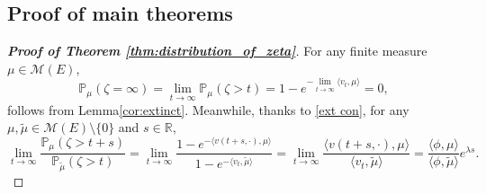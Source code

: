 \documentclass[12pt,a4paper]{amsart}
\numberwithin{equation}{section}
\theoremstyle{plain}
\theoremstyle{definition}
\begin{document}
\subsection{Proof of main theorems}
\begin{proof}[{\bf Proof of Theorem \ref{thm:distribution_of_zeta}}]
	For any finite measure $\mu\in \mathcal M(E)$,
  \[
    \mathbb P_\mu(\zeta=\infty)=\lim_{t\rightarrow\infty}\mathbb P_\mu(\zeta>t)=1-e^{-\lim_{t\rightarrow\infty}\langle v_t,\mu\rangle }=0,
  \]
	follows from Lemma\ref{cor:extinct}.
	Meanwhile, thanks to \eqref{ext con}, for any $\mu,\widetilde\mu\in \mathcal M(E)\setminus\{0\}$ and $s\in\mathbb R$,
  \[
    \lim_{t\rightarrow\infty}\frac{\mathbb P_{\mu}(\zeta>t+s)}{\mathbb P_{\widetilde\mu}(\zeta>t)}=\lim_{t\rightarrow\infty}\frac{1-e^{-\langle v(t+s,\cdot),\mu\rangle }}{1-e^{-\langle v_t,\widetilde\mu\rangle }}
    =\lim_{t\rightarrow\infty}\frac{\langle v(t+s,\cdot),\mu\rangle }{\langle v_t,\widetilde\mu\rangle }=\frac{\langle \phi,\mu\rangle }{\langle \phi,\widetilde\mu\rangle }e^{\lambda s}.
  \]
\end{proof}
\end{document}
